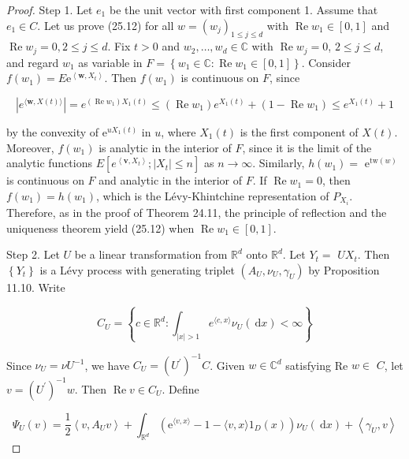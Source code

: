 \documentclass[a4paper,11pt]{article}
\begin{document}
\begin{proof}
    Step 1. Let $e_{1}$ be the unit vector with first component 1. Assume that $e_{1} \in C$. Let us prove (25.12) for all $w=\left(w_{j}\right)_{1 \leq j \leq d}$ with $\operatorname{Re} w_{1} \in[0,1]$ and\\
    $\operatorname{Re} w_{j}=0,2 \leq j \leq d$. Fix $t>0$ and $w_{2}, \ldots, w_{d} \in \mathbb{C}$ with $\operatorname{Re} w_{j}=0$, $2 \leq j \leq d$, and regard $w_{1}$ as variable in $F=\left\{w_{1} \in \mathbb{C}: \operatorname{Re} w_{1} \in[0,1]\right\}$. Consider $f\left(w_{1}\right)=E \mathrm{e}^{\left\langle\boldsymbol{w}, X_{t}\right\rangle}$.
    Then $f\left(w_{1}\right)$ is continuous on $F$, since

    $$
        \left|e^{\langle\boldsymbol{w}, X(t)\rangle}\right|=e^{\left(\operatorname{Re} w_{1}\right) X_{1}(t)} \leq\left(\operatorname{Re} w_{1}\right) e^{X_{1}(t)}+\left(1-\operatorname{Re} w_{1}\right) \leq e^{X_{1}(t)}+1
    $$

    by the convexity of $\mathrm{e}^{u X_{1}(t)}$ in $u$, where $X_{1}(t)$ is the first component of $X(t)$.
    Moreover, $f\left(w_{1}\right)$ is analytic in the interior of $F$, since it is the limit of the analytic
    functions $E\left[e^{\left\langle\boldsymbol{v}, X_{t}\right\rangle} ;\left|X_{t}\right| \leq n\right]$ as $n \rightarrow \infty$.
    Similarly, $h\left(w_{1}\right)=$ $\mathrm{e}^{\mathrm{tw}(w)}$ is continuous on $F$ and analytic in the interior of $F$.
    If $\operatorname{Re} w_{1}=0$, then $f\left(w_{1}\right)=h\left(w_{1}\right)$, which is the Lévy-Khintchine representation
    of $P_{X_{i}}$. Therefore, as in the proof of Theorem 24.11, the principle of reflection and the uniqueness theorem yield (25.12)
    when $\operatorname{Re} w_{1} \in[0,1]$.

    Step 2. Let $U$ be a linear transformation from $\mathbb{R}^{d}$ onto $\mathbb{R}^{d}$. Let $Y_{t}=$ $U X_{t}$.
    Then $\left\{Y_{t}\right\}$ is a Lévy process with generating triplet $\left(A_{U}, \nu_{U}, \gamma_{U}\right)$
    by Proposition 11.10. Write

    $$
        C_{U}=\left\{c \in \mathbb{R}^{d}: \int_{|x|>1} e^{\langle c, x\rangle} \nu_{U}(\mathrm{~d} x)<\infty\right\}
    $$

    Since $\nu_{U}=\nu U^{-1}$, we have $C_{U}=\left(U^{\prime}\right)^{-1} C$. Given $w \in \mathbb{C}^{d}$
    satisfying Re $w \in$ $C$, let $v=\left(U^{\prime}\right)^{-1} w$. Then $\operatorname{Re} v \in C_{U}$. Define

    $$
        \Psi_{U}(v)=\frac{1}{2}\left\langle v, A_{U} v\right\rangle+\int_{\mathbb{R}^{d}}\left(\mathrm{e}^{\langle v, x\rangle}-1-\langle v, x\rangle 1_{D}(x)\right) \nu_{U}(\mathrm{~d} x)+\left\langle\gamma_{U}, v\right\rangle
    $$


\end{proof}
\end{document}
